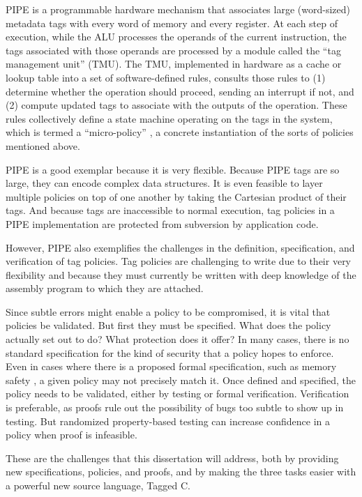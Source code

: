 PIPE is a programmable hardware mechanism that associates large (word-sized) metadata tags
with every word of memory and every register. At each step of execution, while the ALU processes
the operands of the current instruction, the tags associated with those operands are processed
by a module called the ``tag management unit'' (TMU).
The TMU, implemented in hardware as a cache or lookup table into a set of software-defined rules,
consults those rules to (1) determine whether the operation should
proceed, sending an interrupt if not, and (2) compute updated tags to associate with the
outputs of the operation. These rules collectively define a state machine operating on the
tags in the system, which is termed a ``micro-policy'' \cite{Azevedo+15}, a concrete instantiation of the
sorts of policies mentioned above.

PIPE is a good exemplar because it is very flexible. Because PIPE tags are so large,
they can encode complex data structures. It is even feasible to layer
multiple policies on top of one another by taking the Cartesian product of their tags.
And because tags are inaccessible to normal execution, tag policies in a PIPE implementation
are protected from subversion by application code.

However, PIPE also exemplifies the challenges in the definition, specification, and
verification of tag policies. Tag policies are challenging to write due to their very
flexibility and because they must currently be written with deep knowledge of the assembly
program to which they are attached.

Since subtle errors might enable a policy to be compromised,
it is vital that policies be validated. But first they must be specified. What does the
policy actually set out to do? What protection does it offer?
In many cases, there is no standard specification for the kind of security that a policy hopes
to enforce. Even in cases where there is a proposed formal specification, such as
memory safety \cite{Azevedo+16}, a given policy may not precisely match it. 
Once defined and specified, the policy needs to be validated, either by testing or formal
verification. Verification is preferable, as proofs rule out the possibility of bugs too
subtle to show up in testing. But randomized property-based testing can increase confidence
in a policy when proof is infeasible.

These are the challenges that this dissertation will address, both by 
providing new specifications, policies, and proofs, and by making the three tasks
easier with a powerful new source language, Tagged C.

